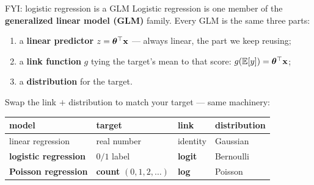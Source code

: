 \documentclass[aspectratio=169]{beamer}
\begin{document}
\begin{frame}{FYI: logistic regression is a GLM}
  Logistic regression is one member of the \textbf{generalized linear model (GLM)} family. Every
  GLM is the same three parts:
  \begin{enumerate}\small
    \item a \textbf{linear predictor} $z = \bm{\theta}^\top \mathbf{x}$ --- always linear, the part we keep reusing;
    \item a \textbf{link function} $g$ tying the target's mean to that score: $g(\mathbb{E}[y]) = \bm{\theta}^\top \mathbf{x}$;
    \item a \textbf{distribution} for the target.
  \end{enumerate}
  \vskip 2pt
  Swap the link $+$ distribution to match your target --- same machinery:
  \begin{center}\small
    \renewcommand{\arraystretch}{1.25}
    \begin{tabular}{l l l l}
      \textbf{model} & \textbf{target} & \textbf{link} & \textbf{distribution} \\
      \hline
      linear regression & real number & identity & Gaussian \\
      \textbf{logistic regression} & $0/1$ label & \textbf{logit} & Bernoulli \\
      \textbf{Poisson regression} & \textbf{count} $(0,1,2,\dots)$ & \textbf{log} & Poisson \\
      \hline
    \end{tabular}
  \end{center}
  \vskip 2pt
\end{frame}
\end{document}
